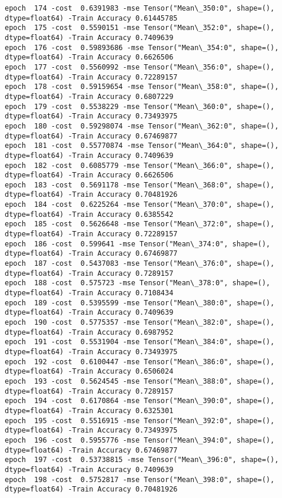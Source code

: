 \documentclass[11pt]{article}
\begin{document}
\begin{Verbatim}[commandchars=\\\{\}]
epoch  174 -cost  0.6391983 -mse Tensor("Mean\_350:0", shape=(), dtype=float64) -Train Accuracy 0.61445785
epoch  175 -cost  0.5590151 -mse Tensor("Mean\_352:0", shape=(), dtype=float64) -Train Accuracy 0.7409639
epoch  176 -cost  0.59893686 -mse Tensor("Mean\_354:0", shape=(), dtype=float64) -Train Accuracy 0.6626506
epoch  177 -cost  0.5560992 -mse Tensor("Mean\_356:0", shape=(), dtype=float64) -Train Accuracy 0.72289157
epoch  178 -cost  0.59159654 -mse Tensor("Mean\_358:0", shape=(), dtype=float64) -Train Accuracy 0.6807229
epoch  179 -cost  0.5538229 -mse Tensor("Mean\_360:0", shape=(), dtype=float64) -Train Accuracy 0.73493975
epoch  180 -cost  0.59298074 -mse Tensor("Mean\_362:0", shape=(), dtype=float64) -Train Accuracy 0.67469877
epoch  181 -cost  0.55770874 -mse Tensor("Mean\_364:0", shape=(), dtype=float64) -Train Accuracy 0.7409639
epoch  182 -cost  0.6085779 -mse Tensor("Mean\_366:0", shape=(), dtype=float64) -Train Accuracy 0.6626506
epoch  183 -cost  0.5691178 -mse Tensor("Mean\_368:0", shape=(), dtype=float64) -Train Accuracy 0.70481926
epoch  184 -cost  0.6225264 -mse Tensor("Mean\_370:0", shape=(), dtype=float64) -Train Accuracy 0.6385542
epoch  185 -cost  0.5626648 -mse Tensor("Mean\_372:0", shape=(), dtype=float64) -Train Accuracy 0.72289157
epoch  186 -cost  0.599641 -mse Tensor("Mean\_374:0", shape=(), dtype=float64) -Train Accuracy 0.67469877
epoch  187 -cost  0.5437083 -mse Tensor("Mean\_376:0", shape=(), dtype=float64) -Train Accuracy 0.7289157
epoch  188 -cost  0.575723 -mse Tensor("Mean\_378:0", shape=(), dtype=float64) -Train Accuracy 0.7108434
epoch  189 -cost  0.5395599 -mse Tensor("Mean\_380:0", shape=(), dtype=float64) -Train Accuracy 0.7409639
epoch  190 -cost  0.5775357 -mse Tensor("Mean\_382:0", shape=(), dtype=float64) -Train Accuracy 0.6987952
epoch  191 -cost  0.5531904 -mse Tensor("Mean\_384:0", shape=(), dtype=float64) -Train Accuracy 0.73493975
epoch  192 -cost  0.6100447 -mse Tensor("Mean\_386:0", shape=(), dtype=float64) -Train Accuracy 0.6506024
epoch  193 -cost  0.5624545 -mse Tensor("Mean\_388:0", shape=(), dtype=float64) -Train Accuracy 0.7289157
epoch  194 -cost  0.6170864 -mse Tensor("Mean\_390:0", shape=(), dtype=float64) -Train Accuracy 0.6325301
epoch  195 -cost  0.5516915 -mse Tensor("Mean\_392:0", shape=(), dtype=float64) -Train Accuracy 0.73493975
epoch  196 -cost  0.5955776 -mse Tensor("Mean\_394:0", shape=(), dtype=float64) -Train Accuracy 0.67469877
epoch  197 -cost  0.53738815 -mse Tensor("Mean\_396:0", shape=(), dtype=float64) -Train Accuracy 0.7409639
epoch  198 -cost  0.5752817 -mse Tensor("Mean\_398:0", shape=(), dtype=float64) -Train Accuracy 0.70481926

\end{Verbatim}
\end{document}
